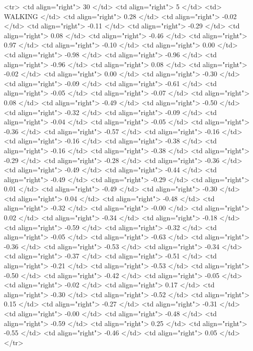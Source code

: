   <tr> <td align="right"> 30 </td> <td align="right">   5 </td> <td> WALKING </td> <td align="right"> 0.28 </td> <td align="right"> -0.02 </td> <td align="right"> -0.11 </td> <td align="right"> -0.29 </td> <td align="right"> 0.08 </td> <td align="right"> -0.46 </td> <td align="right"> 0.97 </td> <td align="right"> -0.10 </td> <td align="right"> 0.00 </td> <td align="right"> -0.98 </td> <td align="right"> -0.96 </td> <td align="right"> -0.96 </td> <td align="right"> 0.08 </td> <td align="right"> -0.02 </td> <td align="right"> 0.00 </td> <td align="right"> -0.30 </td> <td align="right"> -0.09 </td> <td align="right"> -0.61 </td> <td align="right"> -0.05 </td> <td align="right"> -0.07 </td> <td align="right"> 0.08 </td> <td align="right"> -0.49 </td> <td align="right"> -0.50 </td> <td align="right"> -0.32 </td> <td align="right"> -0.09 </td> <td align="right"> -0.04 </td> <td align="right"> -0.05 </td> <td align="right"> -0.36 </td> <td align="right"> -0.57 </td> <td align="right"> -0.16 </td> <td align="right"> -0.16 </td> <td align="right"> -0.38 </td> <td align="right"> -0.16 </td> <td align="right"> -0.38 </td> <td align="right"> -0.29 </td> <td align="right"> -0.28 </td> <td align="right"> -0.36 </td> <td align="right"> -0.49 </td> <td align="right"> -0.44 </td> <td align="right"> -0.49 </td> <td align="right"> -0.29 </td> <td align="right"> 0.01 </td> <td align="right"> -0.49 </td> <td align="right"> -0.30 </td> <td align="right"> 0.04 </td> <td align="right"> -0.48 </td> <td align="right"> -0.32 </td> <td align="right"> -0.00 </td> <td align="right"> 0.02 </td> <td align="right"> -0.34 </td> <td align="right"> -0.18 </td> <td align="right"> -0.59 </td> <td align="right"> -0.32 </td> <td align="right"> -0.05 </td> <td align="right"> -0.63 </td> <td align="right"> -0.36 </td> <td align="right"> -0.53 </td> <td align="right"> -0.34 </td> <td align="right"> -0.37 </td> <td align="right"> -0.51 </td> <td align="right"> -0.21 </td> <td align="right"> -0.53 </td> <td align="right"> -0.50 </td> <td align="right"> -0.42 </td> <td align="right"> -0.05 </td> <td align="right"> -0.02 </td> <td align="right"> 0.17 </td> <td align="right"> -0.30 </td> <td align="right"> -0.52 </td> <td align="right"> 0.15 </td> <td align="right"> -0.27 </td> <td align="right"> -0.31 </td> <td align="right"> -0.00 </td> <td align="right"> -0.48 </td> <td align="right"> -0.59 </td> <td align="right"> 0.25 </td> <td align="right"> -0.55 </td> <td align="right"> -0.46 </td> <td align="right"> 0.05 </td> </tr>
